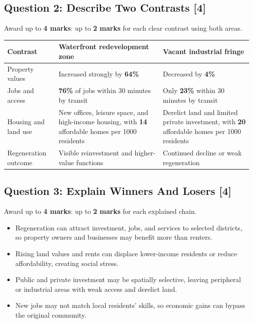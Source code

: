 \documentclass[11pt,a4paper]{article}
\newcommand{\term}[1]{\textcolor{HeadingBlue}{\textbf{#1}}}
\begin{document}
\subsection{Question 2: Describe Two Contrasts [4]}

Award up to \term{4 marks}: up to \term{2 marks} for each clear contrast using
both areas.

\begin{tabularx}{\textwidth}{L{0.24\textwidth}Y Y}
\toprule
\textbf{Contrast} & \textbf{Waterfront redevelopment zone} & \textbf{Vacant industrial fringe} \\
\midrule
Property values & Increased strongly by \term{64\%} & Decreased by
\term{4\%} \\
Jobs and access & \term{76\%} of jobs within 30 minutes by transit & Only
\term{23\%} within 30 minutes by transit \\
Housing and land use & New offices, leisure space, and high-income housing,
with \term{14} affordable homes per 1000 residents & Derelict land and limited
private investment, with \term{20} affordable homes per 1000 residents \\
Regeneration outcome & Visible reinvestment and higher-value functions &
Continued decline or weak regeneration \\
\bottomrule
\end{tabularx}

\subsection{Question 3: Explain Winners And Losers [4]}

Award up to \term{4 marks}: up to \term{2 marks} for each explained chain.

\begin{itemize}
  \item Regeneration can attract investment, jobs, and services to selected
  districts, so property owners and businesses may benefit more than renters.
  \item Rising land values and rents can displace lower-income residents or
  reduce affordability, creating social stress.
  \item Public and private investment may be spatially selective, leaving
  peripheral or industrial areas with weak access and derelict land.
  \item New jobs may not match local residents' skills, so economic gains can
  bypass the original community.
\end{itemize}
\end{document}
